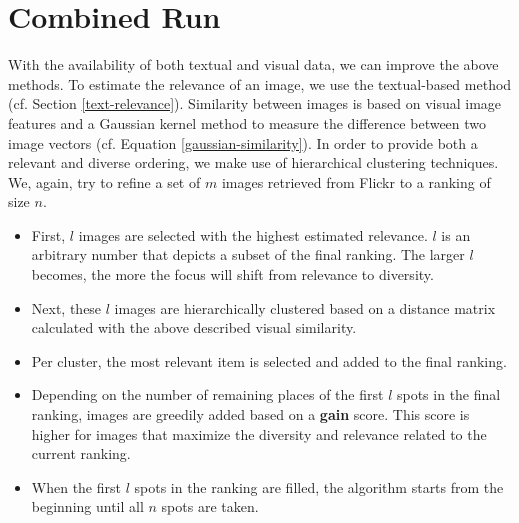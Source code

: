 \documentclass{acm_proc_article-me11_tweaked}
\begin{document}
\section{Combined Run}
With the availability of both textual and visual data, we can improve the above methods.
To estimate the relevance of an image, we use the textual-based method (cf. Section \ref{text-relevance}).
Similarity between images is based on visual image features and a Gaussian kernel method to measure the difference between two image vectors (cf. Equation \ref{gaussian-similarity}).
In order to provide both a relevant and diverse ordering, we make use of hierarchical clustering techniques.
We, again, try to refine a set of $m$ images retrieved from Flickr to a ranking of size $n$.
\begin{itemize}
 \item First, $l$ images are selected with the highest estimated relevance. $l$ is an arbitrary number that depicts a subset of the final ranking. 
The larger $l$ becomes, the more the focus will shift from relevance to diversity. 
 \item Next, these $l$ images are hierarchically clustered based on a distance matrix calculated with the above described visual similarity.
 \item Per cluster, the most relevant item is selected and added to the final ranking.
 \item Depending on the number of remaining places of the first $l$ spots in the final ranking, images are greedily added based on a \textbf{gain} score.
 This score is higher for images that maximize the diversity and relevance related to the current ranking.
 \item When the first $l$ spots in the ranking are filled, the algorithm starts from the beginning until all $n$ spots are taken.
 
\end{itemize}
\end{document}
